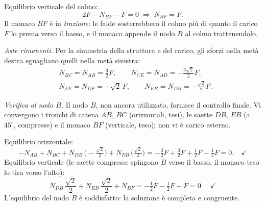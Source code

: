 \begin{esempio}
\begin{svolgimento}
		Equilibrio verticale del colmo:
		\[
		2F - N_{BF} - F = 0
		\;\Rightarrow\;
		N_{BF} = F.
		\]
		Il monaco $BF$ è in \emph{trazione}: le falde
		sosterrebbero il colmo più di quanto il carico $F$
		lo prema verso il basso, e il monaco appende il nodo
		$B$ al colmo trattenendolo.
		
		\textit{Aste rimanenti.}
		Per la simmetria della struttura e del carico, gli
		sforzi nella metà destra eguagliano quelli nella
		metà sinistra:
	\[
	\begin{aligned}
		&N_{BC} = N_{AB} = \frac{3}{2}F, \qquad
		N_{CE} = N_{AD} = -\frac{3\sqrt2}{2}F, \\[4pt]
		&N_{FE} = N_{DF} = -\sqrt2\,F, \qquad
		N_{EB} = N_{DB} = -\frac{\sqrt2}{2}F.
	\end{aligned}
	\]
		
		\textit{Verifica al nodo $B$.}
		Il nodo $B$, non ancora utilizzato, fornisce il
		controllo finale. Vi convergono i tronchi di catena
		$AB$, $BC$ (orizzontali, tesi), le saette $DB$, $EB$
		(a $45^\circ$, compresse) e il monaco $BF$ (verticale,
		teso); non vi è carico esterno.
		
		Equilibrio orizzontale:
		\[
		-N_{AB} + N_{BC}
		+ N_{DB}\,\Big(\!-\tfrac{\sqrt2}{2}\Big)
		+ N_{EB}\,\Big(\tfrac{\sqrt2}{2}\Big)
		= -\tfrac{3}{2}F + \tfrac{3}{2}F
		+ \tfrac{1}{2}F - \tfrac{1}{2}F = 0. \quad\checkmark
		\]
		Equilibrio verticale (le saette compresse spingono
		$B$ verso il basso, il monaco teso lo tira verso
		l'alto):
		\[
		N_{DB}\,\frac{\sqrt2}{2} + N_{EB}\,\frac{\sqrt2}{2}
		+ N_{BF}
		= -\tfrac{1}{2}F - \tfrac{1}{2}F + F = 0. \quad\checkmark
		\]
		L'equilibrio del nodo $B$ è soddisfatto: la soluzione
		è completa e congruente.
		

\end{svolgimento}
\end{esempio}
